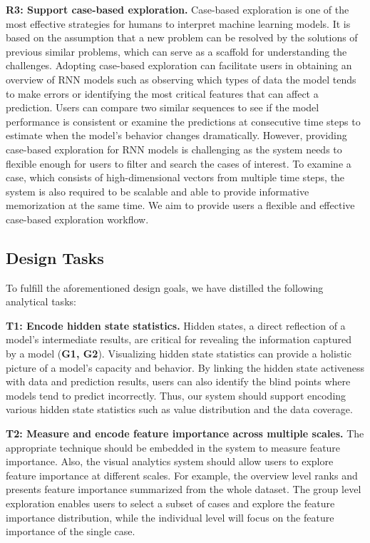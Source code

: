 \textbf{R3: Support case-based exploration.} 
Case-based exploration is one of the most effective strategies for humans to interpret machine learning models. 
It is based on the assumption that a new problem can be resolved by the solutions of previous similar problems, which can serve as a scaffold for understanding the challenges. 
Adopting case-based exploration can facilitate users in obtaining an overview of RNN models such as observing which types of data the model tends to make errors or identifying the most critical features that can affect a prediction. 
Users can compare two similar sequences to see if the model performance is consistent or examine the predictions at consecutive time steps to estimate when the model's behavior changes dramatically. 
However, providing case-based exploration for RNN models is challenging as the system needs to flexible enough for users to filter and search the cases of interest. 
To examine a case, which consists of high-dimensional vectors from multiple time steps, the system is also required to be scalable and able to provide informative memorization at the same time. 
We aim to provide users a flexible and effective case-based exploration workflow.

\subsection{Design Tasks}
\label{section:design_tasks}
To fulfill the aforementioned design goals, we have distilled the following analytical tasks:

\textbf{T1: Encode hidden state statistics.}
Hidden states, a direct reflection of a model's intermediate results, are critical for revealing the information captured by a model (\textbf{G1, G2}).
Visualizing hidden state statistics can provide a holistic picture of a model's capacity and behavior.
By linking the hidden state activeness with data and prediction results, users can also identify the blind points where models tend to predict incorrectly.
Thus, our system should support encoding various hidden state statistics such as value distribution and the data coverage.

\textbf{T2: Measure and encode feature importance across multiple scales.}
The appropriate technique should be embedded in the system to measure feature importance. 
Also, the visual analytics system should allow users to explore feature importance at different scales. 
For example, the overview level ranks and presents feature importance summarized from the whole dataset. 
The group level exploration enables users to select a subset of cases and explore the feature importance distribution, while the individual level will focus on the feature importance of the single case.


